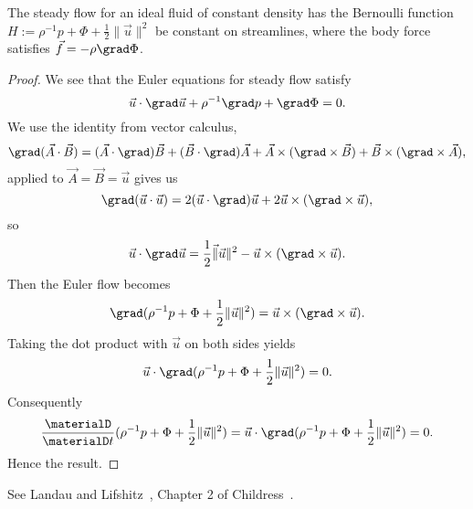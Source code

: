 \begin{node}[Hydrostatics]
\begin{node}
\begin{theorem}[Bernoulli]\label{fluids:euler-flow-000E}%
The steady flow for an ideal fluid of constant density has the Bernoulli
function $H:=\rho^{-1}p+\Phi+\frac{1}{2}\|\vec{u}\|^{2}$ be constant on
streamlines, where the body force satisfies $\vec{f}=-\rho\grad\Phi$.
\end{theorem}

\begin{proof}
We see that the Euler equations for steady flow satisfy
\begin{equation*}
\vec{u}\cdot\grad\vec{u}+\rho^{-1}\grad p+\grad\Phi=0.
\end{equation*}
We use the identity from vector calculus,
\begin{equation*}
\grad(\vec{A}\cdot\vec{B})=(\vec{A}\cdot\grad)\vec{B}+(\vec{B}\cdot\grad)\vec{A}+\vec{A}\times(\grad\times\vec{B})+\vec{B}\times(\grad\times\vec{A}),
\end{equation*}
applied to $\vec{A}=\vec{B}=\vec{u}$ gives us
\begin{equation*}
\grad(\vec{u}\cdot\vec{u})=2(\vec{u}\cdot\grad)\vec{u}+2\vec{u}\times(\grad\times\vec{u}),
\end{equation*}
so
\begin{equation*}
\vec{u}\cdot\grad\vec{u}=\frac{1}{2}\vec\|\vec{u}\|^{2}-\vec{u}\times(\grad\times\vec{u}).
\end{equation*}
Then the Euler flow becomes
\begin{equation}
\grad(\rho^{-1}p+\Phi+\frac{1}{2}\|\vec{u}\|^{2})=\vec{u}\times(\grad\times\vec{u}).
\end{equation}
Taking the dot product with $\vec{u}$ on both sides yields
\begin{equation}
\vec{u}\cdot\grad(\rho^{-1}p+\Phi+\frac{1}{2}\|\vec{u}\|^{2})=0.
\end{equation}
Consequently
\begin{equation}
\frac{\materialD}{\materialD t}(\rho^{-1}p+\Phi+\frac{1}{2}\|\vec{u}\|^{2})
=\vec{u}\cdot\grad(\rho^{-1}p+\Phi+\frac{1}{2}\|\vec{u}\|^{2})
=0.
\end{equation}
Hence the result.
\end{proof}
\end{node}

\begin{node}[References]\label{fluids:euler-flow-000A}%
See Landau and Lifshitz~\cite[\S3]{landau1987fluids}, Chapter 2 of
Childress~\cite{childress2009introduction}. 
\end{node}
\end{node}